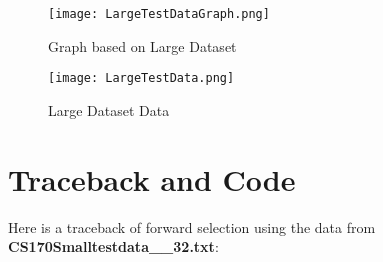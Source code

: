 \documentclass{article}
\begin{document}
\begin{sidewaysfigure}
  \texttt{[image: LargeTestDataGraph.png]}
  \caption{Graph based on Large Dataset}
\end{sidewaysfigure}
\clearpage

\begin{sidewaysfigure}
  \texttt{[image: LargeTestData.png]}  
  \caption{Large Dataset Data}
\end{sidewaysfigure}
\clearpage

\section{Traceback and Code}
Here is a traceback of forward selection using the data from
\textbf{CS170Smalltestdata\_\_32.txt}:
\end{document}
